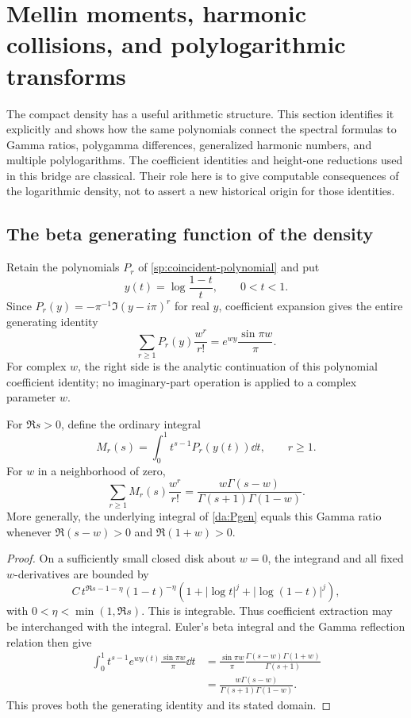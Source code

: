 \section{Mellin moments, harmonic collisions, and polylogarithmic transforms}
\label{da:section}

The compact density has a useful arithmetic structure. This section
identifies it explicitly and shows how the same polynomials connect the
spectral formulas to Gamma ratios, polygamma differences, generalized
harmonic numbers, and multiple polylogarithms. The coefficient identities
and height-one reductions used in this bridge are classical. Their role
here is to give computable consequences of the logarithmic density, not
to assert a new historical origin for those identities.

\subsection{The beta generating function of the density}

Retain the polynomials \(P_r\) of \eqref{sp:coincident-polynomial} and put
\[
 y(t)=\log\frac{1-t}{t},\qquad 0<t<1.
\]
Since \(P_r(y)=-\pi^{-1}\Im(y-i\pi)^r\) for real \(y\), coefficient
expansion gives the entire generating identity
\begin{equation}\label{da:Pgen}
 \sum_{r\ge1}P_r(y)\frac{w^r}{r!}
       =e^{wy}\frac{\sin\pi w}{\pi}.
\end{equation}
For complex \(w\), the right side is the analytic continuation of this
polynomial coefficient identity; no imaginary-part operation is applied
to a complex parameter \(w\).

\begin{theorem}
\label{da:mellin}
For \(\Re s>0\), define the ordinary integral
\[
 M_r(s)=\int_0^1 t^{s-1}P_r(y(t))\dd t,\qquad r\ge1.
\]
For \(w\) in a neighborhood of zero,
\begin{equation}\label{da:mellin-gen}
 \boxed{\displaystyle
  \sum_{r\ge1}M_r(s)\frac{w^r}{r!}
     =\frac{w\Gamma(s-w)}{\Gamma(s+1)\Gamma(1-w)}.}
\end{equation}
More generally, the underlying integral of \eqref{da:Pgen} equals this
Gamma ratio whenever \(\Re(s-w)>0\) and \(\Re(1+w)>0\).
\end{theorem}

\begin{proof}
On a sufficiently small closed disk about \(w=0\), the integrand and all
fixed \(w\)-derivatives are bounded by
\[
 C\,t^{\Re s-1-\eta}(1-t)^{-\eta}
       (1+|\log t|^j+|\log(1-t)|^j),
\]
with \(0<\eta<\min(1,\Re s)\). This is integrable. Thus
coefficient extraction may be interchanged with the integral.
Euler's beta integral and the Gamma reflection relation then give
\begin{align*}
 \int_0^1t^{s-1}e^{wy(t)}\frac{\sin\pi w}{\pi}\dd t
 &=\frac{\sin\pi w}{\pi}
      \frac{\Gamma(s-w)\Gamma(1+w)}{\Gamma(s+1)}\\
 &=\frac{w\Gamma(s-w)}{\Gamma(s+1)\Gamma(1-w)}.
\end{align*}
This proves both the generating identity and its stated domain.
\end{proof}

